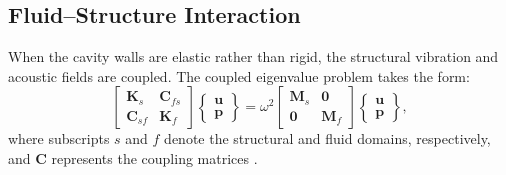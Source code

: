 
\subsection{Fluid--Structure Interaction}

When the cavity walls are elastic rather than rigid, the structural vibration
and acoustic fields are coupled. The coupled eigenvalue problem takes the form:
%
\begin{equation}
  \begin{bmatrix}
    \mathbf{K}_s & \mathbf{C}_{fs} \\
    \mathbf{C}_{sf} & \mathbf{K}_f
  \end{bmatrix}
  \begin{Bmatrix}
    \mathbf{u} \\ \mathbf{p}
  \end{Bmatrix}
  = \omega^2
  \begin{bmatrix}
    \mathbf{M}_s & \mathbf{0} \\
    \mathbf{0} & \mathbf{M}_f
  \end{bmatrix}
  \begin{Bmatrix}
    \mathbf{u} \\ \mathbf{p}
  \end{Bmatrix},
  \label{eq:coupled_eigenvalue}
\end{equation}
%
where subscripts $s$ and $f$ denote the structural and fluid domains,
respectively, and $\mathbf{C}$ represents the coupling matrices
\citep{Junger1986}.
